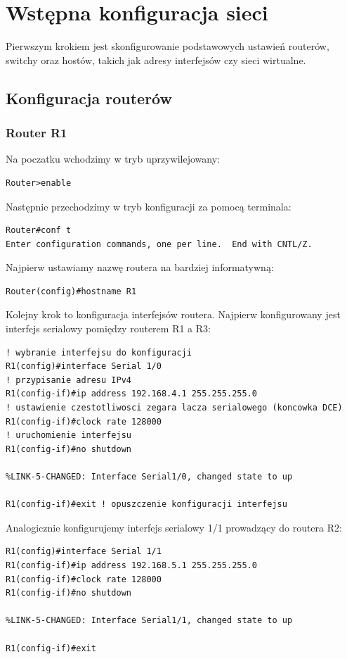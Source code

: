 \documentclass[polish,11pt,a4paper,twoside]{article}
\begin{document}
\section{Wstępna konfiguracja sieci}
Pierwszym krokiem jest skonfigurowanie podstawowych ustawień routerów, switchy oraz hostów, takich jak adresy interfejsów czy sieci wirtualne.

\subsection{Konfiguracja routerów}

\subsubsection{Router R1}

Na poczatku wchodzimy w tryb uprzywilejowany:
\begin{lstlisting}
Router>enable
\end{lstlisting}
Następnie przechodzimy w tryb konfiguracji za pomocą terminala:
\begin{lstlisting}
Router#conf t
Enter configuration commands, one per line.  End with CNTL/Z.
\end{lstlisting}
Najpierw ustawiamy nazwę routera na bardziej informatywną:
\begin{lstlisting}
Router(config)#hostname R1
\end{lstlisting}
Kolejny krok to konfiguracja interfejsów routera. Najpierw konfigurowany jest interfejs serialowy pomiędzy routerem R1 a R3:
\begin{lstlisting}
! wybranie interfejsu do konfiguracji
R1(config)#interface Serial 1/0 
! przypisanie adresu IPv4
R1(config-if)#ip address 192.168.4.1 255.255.255.0 
! ustawienie czestotliwosci zegara lacza serialowego (koncowka DCE)
R1(config-if)#clock rate 128000 
! uruchomienie interfejsu
R1(config-if)#no shutdown 

%LINK-5-CHANGED: Interface Serial1/0, changed state to up

R1(config-if)#exit ! opuszczenie konfiguracji interfejsu
\end{lstlisting}
Analogicznie konfigurujemy interfejs serialowy 1/1 prowadzący do routera R2:
\begin{lstlisting}
R1(config)#interface Serial 1/1
R1(config-if)#ip address 192.168.5.1 255.255.255.0
R1(config-if)#clock rate 128000
R1(config-if)#no shutdown 

%LINK-5-CHANGED: Interface Serial1/1, changed state to up

R1(config-if)#exit
\end{lstlisting}
\end{document}
